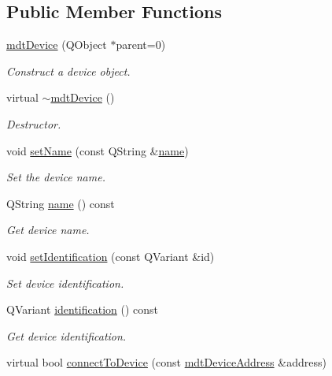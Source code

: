 \subsection*{Public Member Functions}
\begin{DoxyCompactItemize}
\item 
\hyperlink{classmdt_device_a6d501791e7243358cc61b144254b80db}{mdt\-Device} (Q\-Object $\ast$parent=0)
\begin{DoxyCompactList}\small\item\em Construct a device object. \end{DoxyCompactList}\item 
virtual \hyperlink{classmdt_device_ac2a9cfd6042f3f9d8da4e84f044d3f4a}{$\sim$mdt\-Device} ()
\begin{DoxyCompactList}\small\item\em Destructor. \end{DoxyCompactList}\item 
void \hyperlink{classmdt_device_a80186f1aa6fbdc13f1652de978c35518}{set\-Name} (const Q\-String \&\hyperlink{classmdt_device_a7ad893c6885dbaef5a6cb980bfe627e0}{name})
\begin{DoxyCompactList}\small\item\em Set the device name. \end{DoxyCompactList}\item 
Q\-String \hyperlink{classmdt_device_a7ad893c6885dbaef5a6cb980bfe627e0}{name} () const 
\begin{DoxyCompactList}\small\item\em Get device name. \end{DoxyCompactList}\item 
void \hyperlink{classmdt_device_af6fddf7fba1f54e481a4f3445db64d98}{set\-Identification} (const Q\-Variant \&id)
\begin{DoxyCompactList}\small\item\em Set device identification. \end{DoxyCompactList}\item 
Q\-Variant \hyperlink{classmdt_device_a54845e1af6f6f98de7de79c3df9ac7b5}{identification} () const 
\begin{DoxyCompactList}\small\item\em Get device identification. \end{DoxyCompactList}\item 
virtual bool \hyperlink{classmdt_device_ac57bc624391a4035b20bfd29dbbea7da}{connect\-To\-Device} (const \hyperlink{classmdt_device_address}{mdt\-Device\-Address} \&address)

\end{DoxyCompactItemize}
